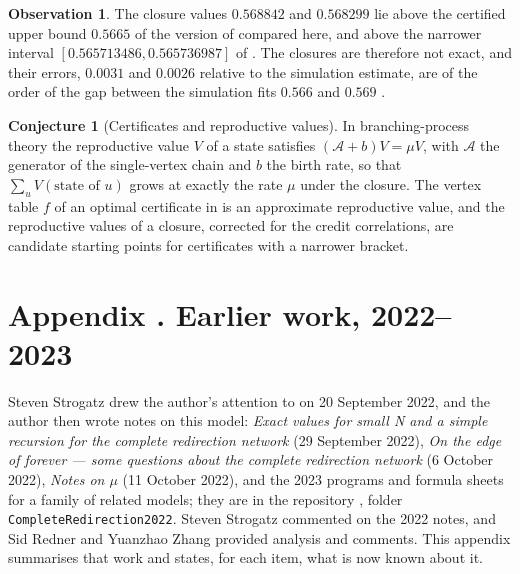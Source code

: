 \documentclass[11pt]{article}
\theoremstyle{plain}
\theoremstyle{definition}
\newtheorem{observation}[theorem]{Observation}
\newtheorem{conjecture}[theorem]{Conjecture}
\theoremstyle{remark}
\begin{document}
\begin{observation}
The closure values $0.568842$ and $0.568299$ lie above the certified upper bound $0.5665$ of the version of \cite{Uzay2026} compared here, and above the narrower interval $[0.565713486,0.565736987]$ of \cite{UzayR3}. The closures are therefore not exact, and their errors, $0.0031$ and $0.0026$ relative to the simulation estimate, are of the order of the gap between the simulation fits $0.566$ \cite{KR2017} and $0.569$ \cite{HKRZ2026}.
\end{observation}

\begin{conjecture}[Certificates and reproductive values]
In branching-process theory the reproductive value $V$ of a state satisfies $(\mathcal{A}+b)V=\mu V$, with $\mathcal{A}$ the generator of the single-vertex chain and $b$ the birth rate, so that $\sum_uV(\text{state of }u)$ grows at exactly the rate $\mu$ under the closure. The vertex table $f$ of an optimal certificate in \cite{Uzay2026} is an approximate reproductive value, and the reproductive values of a closure, corrected for the credit correlations, are candidate starting points for certificates with a narrower bracket.
\end{conjecture}


\section*{Appendix \thesection. Earlier work, 2022--2023}\label{app:earlier}

Steven Strogatz drew the author's attention to \cite{KR2017} on 20 September 2022, and the author then wrote notes on this model: \emph{Exact values for small N and a simple recursion for the complete redirection network} (29 September 2022), \emph{On the edge of forever --- some questions about the complete redirection network} (6 October 2022), \emph{Notes on $\mu$} (11 October 2022), and the 2023 programs and formula sheets for a family of related models; they are in the repository \cite{Repo}, folder \texttt{CompleteRedirection2022}. Steven Strogatz commented on the 2022 notes, and Sid Redner and Yuanzhao Zhang provided analysis and comments. This appendix summarises that work and states, for each item, what is now known about it.
\end{document}
